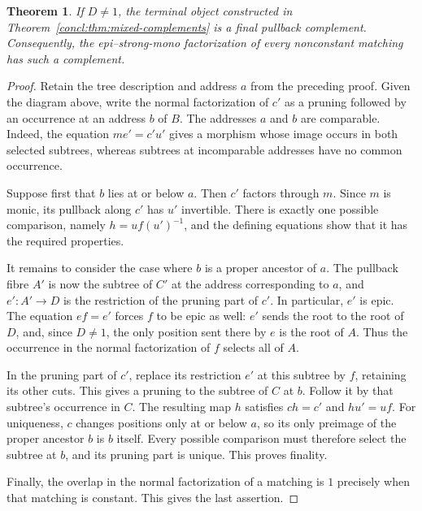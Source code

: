\documentclass[11pt,a4paper]{article}
\theoremstyle{plain}
\newtheorem{theorem}{Theorem}[section]
\theoremstyle{definition}
\theoremstyle{remark}
\begin{document}
\begin{theorem}\label{concl:thm:nonconstant-final-complements}
If $D\ne1$, the terminal object constructed in
Theorem~\ref{concl:thm:mixed-complements} is a final pullback
complement. Consequently, the epi--strong-mono factorization
of every nonconstant matching has such a complement.
\end{theorem}
\begin{proof}
Retain the tree description and address $a$ from the preceding
proof. Given the diagram above, write the normal factorization
of $c'$ as a pruning followed by an occurrence at an address
$b$ of $B$. The addresses $a$ and $b$ are comparable. Indeed,
the equation $me'=c'u'$ gives a morphism whose image occurs
in both selected subtrees, whereas subtrees at incomparable
addresses have no common occurrence.

Suppose first that $b$ lies at or below $a$. Then $c'$ factors
through $m$. Since $m$ is monic, its pullback along $c'$ has
$u'$ invertible. There is exactly one possible comparison,
namely $h=uf(u')^{-1}$, and the defining equations show that
it has the required properties.

It remains to consider the case where $b$ is a proper ancestor
of $a$. The pullback fibre $A'$ is now the subtree of $C'$ at
the address corresponding to $a$, and $e':A'\to D$ is the
restriction of the pruning part of $c'$. In particular, $e'$
is epic. The equation $ef=e'$ forces $f$ to be epic as well:
$e'$ sends the root to the root of $D$, and, since $D\ne1$,
the only position sent there by $e$ is the root of $A$.
Thus the occurrence in the normal factorization of $f$
selects all of $A$.

In the pruning part of $c'$, replace its restriction $e'$ at
this subtree by $f$, retaining its other cuts. This gives a
pruning to the subtree of $C$ at $b$. Follow it by that
subtree's occurrence in $C$. The resulting map $h$ satisfies
$ch=c'$ and $hu'=uf$. For uniqueness, $c$ changes positions
only at or below $a$, so its only preimage of the proper
ancestor $b$ is $b$ itself. Every possible comparison must
therefore select the subtree at $b$, and its pruning part is
unique. This proves finality.

Finally, the overlap in the normal factorization of a
matching is $1$ precisely when that matching is constant.
This gives the last assertion.
\end{proof}
\end{document}
